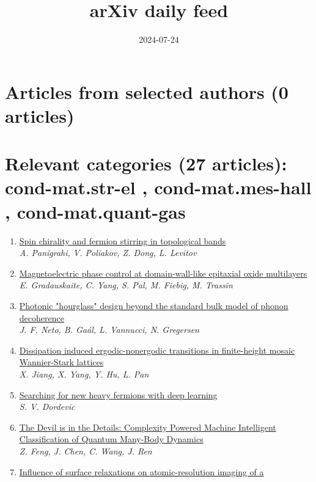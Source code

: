 \documentclass{article}
\title{arXiv daily feed}
\author{}
\date{2024-07-24}
\begin{document}
\maketitle

\section*{Articles from selected authors (0 articles)}
\section*{Relevant categories (27 articles): 
cond-mat.str-el
, 
cond-mat.mes-hall
, 
cond-mat.quant-gas
}
\begin{enumerate}
\item\href{http://arxiv.org/abs/2407.17433v1}{\textsf{Spin chirality and fermion stirring in topological bands}}\\
{\small\color{blue}\textsl{A. Panigrahi, V. Poliakov, Z. Dong, L. Levitov}}
\item\href{http://arxiv.org/abs/2407.17368v1}{\textsf{Magnetoelectric phase control at domain-wall-like epitaxial oxide
  multilayers}}\\
{\small\color{blue}\textsl{E. Gradauskaite, C. Yang, S. Pal, M. Fiebig, M. Trassin}}
\item\href{http://arxiv.org/abs/2407.17309v1}{\textsf{Photonic "hourglass" design beyond the standard bulk model of phonon
  decoherence}}\\
{\small\color{blue}\textsl{J. F. Neto, B. Gaál, L. Vannucci, N. Gregersen}}
\item\href{http://arxiv.org/abs/2407.17301v1}{\textsf{Dissipation induced ergodic-nonergodic transitions in finite-height
  mosaic Wannier-Stark lattices}}\\
{\small\color{blue}\textsl{X. Jiang, X. Yang, Y. Hu, L. Pan}}
\item\href{http://arxiv.org/abs/2407.17290v1}{\textsf{Searching for new heavy fermions with deep learning}}\\
{\small\color{blue}\textsl{S. V. Dordevic}}
\item\href{http://arxiv.org/abs/2407.17266v1}{\textsf{The Devil is in the Details: Complexity Powered Machine Intelligent
  Classification of Quantum Many-Body Dynamics}}\\
{\small\color{blue}\textsl{Z. Feng, J. Chen, C. Wang, J. Ren}}
\item\href{http://arxiv.org/abs/2407.17231v1}{\textsf{Influence of surface relaxations on atomic-resolution imaging of a
}}
\end{enumerate}
\end{document}
